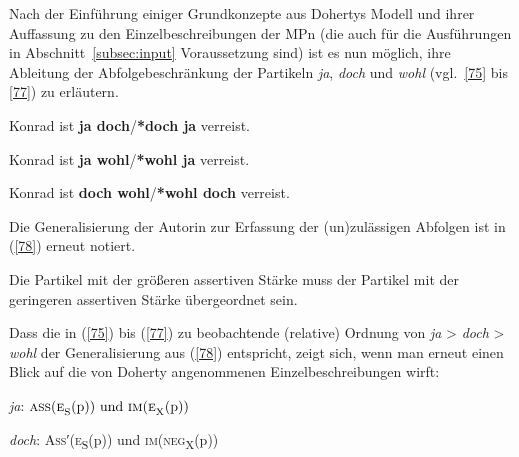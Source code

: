 Nach der Einführung einiger Grundkonzepte aus Dohertys Modell und ihrer Auffassung zu den Einzelbeschreibungen der MPn (die auch für die Ausführungen in Abschnitt~\ref{subsec:input} Voraussetzung sind) ist es nun möglich, ihre Ableitung der Abfolgebeschränkung der Partikeln \textit{ja}, \textit{doch} und \textit{wohl} (vgl.\ \ref{75} bis \ref{77}) zu erläutern.

\begin{exe}
	\ex\label{75} 
	Konrad ist \textbf{ja doch}/\textbf{*doch ja} verreist.		
\end{exe}
\begin{exe}
	\ex\label{76} 
	Konrad ist \textbf{ja wohl}/\textbf{*wohl ja} verreist.	
\end{exe}
\begin{exe}
	\ex\label{77} 
	Konrad ist \textbf{doch wohl}/\textbf{*wohl doch} verreist.
	\hfill\hbox{\citet[83]{Doherty1985}}
\end{exe}
Die Generalisierung der Autorin zur Erfassung der (un)zulässigen Abfolgen ist in (\ref{78}) erneut notiert.

\begin{exe}
	\ex\label{78} 
	Die Partikel mit der größeren assertiven Stärke muss der Partikel mit der geringeren assertiven Stärke übergeordnet sein.	
	\hfill\hbox{\citet[83]{Doherty1985}}
\end{exe}
Dass die in (\ref{75}) bis (\ref{77}) zu beobachtende (relative) Ordnung von \textit{ja} > \textit{doch} > \textit{wohl} der Generalisierung aus (\ref{78}) entspricht, zeigt sich, wenn man erneut einen Blick auf die von Doherty angenommenen Einzelbeschreibungen wirft:

\begin{exe}
	\ex\label{79} 
	\textit{ja}: $\textrm{\textsc{ass}(\textsc{e}}_{\textrm{S}}(\textrm{p})) \ \textrm{und \textsc{im}(\textsc{e}}_{\textrm{X}}(\textrm{p}))$
\end{exe}
	
\begin{exe}
	\ex\label{80} 
	\textit{doch}: \textsc{Ass}′(\textsc{e}\textsubscript{S}(p)) und \textsc{im(neg}\textsubscript{X}(p))
\end{exe}	
	
